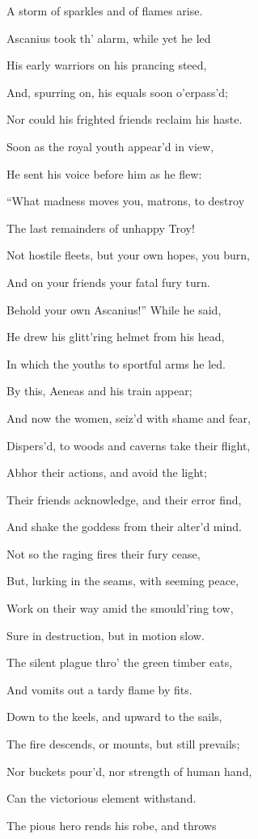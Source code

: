A storm of sparkles and of flames arise.

Ascanius took th’ alarm, while yet he led

His early warriors on his prancing steed,

And, spurring on, his equals soon o’erpass’d;

Nor could his frighted friends reclaim his haste.

Soon as the royal youth appear’d in view,

He sent his voice before him as he flew:

“What madness moves you, matrons, to destroy

The last remainders of unhappy Troy!

Not hostile fleets, but your own hopes, you burn,

And on your friends your fatal fury turn.

Behold your own Ascanius!” While he said,

He drew his glitt’ring helmet from his head,

In which the youths to sportful arms he led.

By this, Aeneas and his train appear;

And now the women, seiz’d with shame and fear,

Dispers’d, to woods and caverns take their flight,

Abhor their actions, and avoid the light;

Their friends acknowledge, and their error find,

And shake the goddess from their alter’d mind.

Not so the raging fires their fury cease,

But, lurking in the seams, with seeming peace,

Work on their way amid the smould’ring tow,

Sure in destruction, but in motion slow.

The silent plague thro’ the green timber eats,

And vomits out a tardy flame by fits.

Down to the keels, and upward to the sails,

The fire descends, or mounts, but still prevails;

Nor buckets pour’d, nor strength of human hand,

Can the victorious element withstand.

The pious hero rends his robe, and throws

